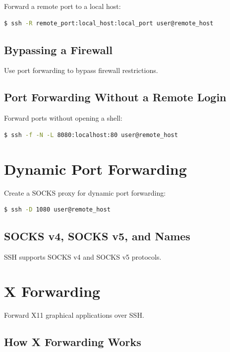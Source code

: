 \documentclass[12pt]{book}
\begin{document}
Forward a remote port to a local host:

\begin{lstlisting}[language=bash]
$ ssh -R remote_port:local_host:local_port user@remote_host
\end{lstlisting}

\subsection{Bypassing a Firewall}

Use port forwarding to bypass firewall restrictions.

\subsection{Port Forwarding Without a Remote Login}

Forward ports without opening a shell:

\begin{lstlisting}[language=bash]
$ ssh -f -N -L 8080:localhost:80 user@remote_host
\end{lstlisting}

\section{Dynamic Port Forwarding}

Create a SOCKS proxy for dynamic port forwarding:

\begin{lstlisting}[language=bash]
$ ssh -D 1080 user@remote_host
\end{lstlisting}

\subsection{SOCKS v4, SOCKS v5, and Names}

SSH supports SOCKS v4 and SOCKS v5 protocols.

\section{X Forwarding}

Forward X11 graphical applications over SSH.

\subsection{How X Forwarding Works}
\end{document}
